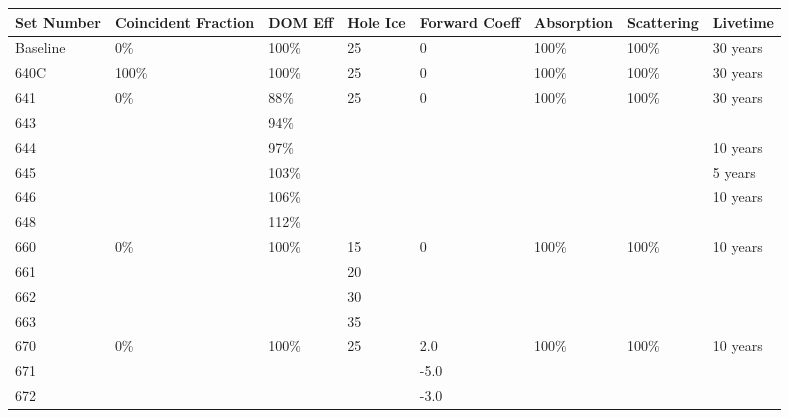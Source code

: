 \begin{landscape}
\begin{table}[]
\centering
\begin{tabular}{@{}llllllll@{}}
\toprule
Set Number & Coincident Fraction & DOM Eff & Hole Ice & Forward Coeff & Absorption & Scattering & Livetime \\ \midrule
Baseline  & 0\%                 & 100\%   & 25       & 0             & 100\%      & 100\%      & 30 years \\ \midrule
640C      & 100\%               & 100\%   & 25       & 0             & 100\%      & 100\%      & 30 years \\ \midrule
641        & 0\%                 & 88\%    & 25       & 0             & 100\%      & 100\%      & 30 years \\
643        &                     & 94\%    &          &               &            &            &          \\
644        &                     & 97\%    &          &               &            &            & 10 years         \\
645        &                     & 103\%   &          &               &            &            & 5 years          \\
646        &                     & 106\%   &          &               &            &            & 10 years         \\
648        &                     & 112\%   &          &               &            &            &          \\ \midrule
660        & 0\%                 & 100\%   & 15       & 0             & 100\%      & 100\%      & 10 years \\
661        &                     &         & 20       &               &            &            &          \\
662        &                     &         & 30       &               &            &            &          \\
663        &                     &         & 35       &               &            &            &          \\ \midrule
670        & 0\%              & 100\%  & 25 & 2.0           & 100\%  & 100\%  & 10 years \\ 
671        &                     &         &          & -5.0          &            &            &         \\
672        &                     &         &          & -3.0          &            &            &          \\

\end{tabular}
\end{table}
\end{landscape}
